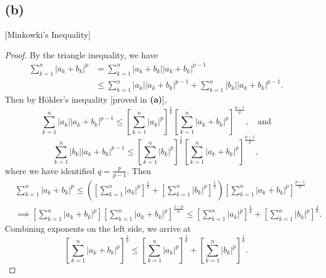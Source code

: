 \documentclass{article}
\begin{document}
\subsection*{(b)}
[Minkowki's Inequality]
\begin{proof}
	By the triangle inequality, we have
	\begin{align}
		\sum_{k=1}^n|a_k + b_k|^p &= \sum_{k=1}^n |a_k + b_k||a_k + b_k|^{p-1}\\
		&\leq \sum_{k=1}^n|a_k||a_k + b_k|^{p-1} + \sum_{k=1}^n|b_k||a_k + b_k|^{p-1}.
	\end{align}
	Then by Hölder's inequality [proved in \textbf{(a)}], 
	\begin{equation}
		\sum_{k=1}^n |a_k||a_k + b_k|^{p-1}\leq \left[\sum_{k=1}^n |a_k|^p\right]^\frac{1}{p} \left[\sum_{k=1}^n |a_k + b_k|^p\right]^\frac{p-1}{p}, \quad \textrm{and}
	\end{equation}
	\begin{equation}
		\sum_{k=1}^n |b_k||a_k + b_k|^{p-1}\leq \left[\sum_{k=1}^n |b_k|^p\right]^\frac{1}{p} \left[\sum_{k=1}^n |a_k + b_k|^p\right]^\frac{p-1}{p},
	\end{equation}
	where we have identified $q=\frac{p}{p-1}$. Then
	\begin{align}
		&\sum_{k=1}^n|a_k + b_k|^p \leq \left(\left[\sum_{k=1}^n |a_k|^p\right]^\frac{1}{p} + \left[\sum_{k=1}^n |b_k|^p\right]^\frac{1}{p}\right)\left[\sum_{k=1}^n |a_k + b_k|^p\right]^\frac{p-1}{p} \\
		&\implies \left[\sum_{k=1}^n|a_k + b_k|^p\right] \left[\sum_{k=1}^n |a_k + b_k|^p\right]^\frac{1-p}{p} \leq \left[\sum_{k=1}^n |a_k|^p\right]^\frac{1}{p} + \left[\sum_{k=1}^n |b_k|^p\right]^\frac{1}{p}. 
	\end{align}
	Combining exponents on the left side, we arrive at
	\begin{equation}
		\left[\sum_{k=1}^n |a_k + b_k|^p\right]^\frac{1}{p} \leq \left[\sum_{k=1}^n |a_k|^p\right]^\frac{1}{p} + \left[\sum_{k=1}^n |b_k|^p\right]^\frac{1}{p}.
	\end{equation}
\end{proof}

\end{document}
